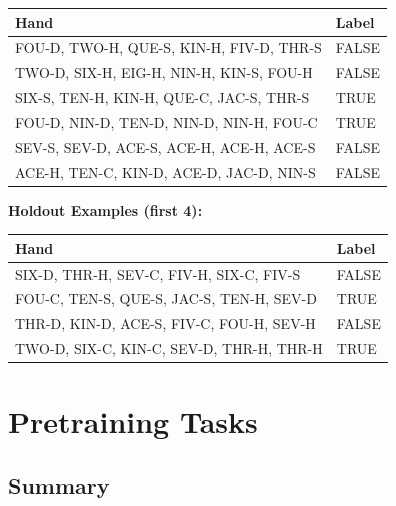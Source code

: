 \documentclass[10pt,a4paper]{article}
\begin{document}
\begin{small}
\begin{tabular}{p{8cm}l}
\toprule
Hand & Label \\
\midrule
FOU-D, TWO-H, QUE-S, KIN-H, FIV-D, THR-S & \textcolor{negative}{FALSE} \\
TWO-D, SIX-H, EIG-H, NIN-H, KIN-S, FOU-H & \textcolor{negative}{FALSE} \\
SIX-S, TEN-H, KIN-H, QUE-C, JAC-S, THR-S & \textcolor{positive}{TRUE} \\
FOU-D, NIN-D, TEN-D, NIN-D, NIN-H, FOU-C & \textcolor{positive}{TRUE} \\
SEV-S, SEV-D, ACE-S, ACE-H, ACE-H, ACE-S & \textcolor{negative}{FALSE} \\
ACE-H, TEN-C, KIN-D, ACE-D, JAC-D, NIN-S & \textcolor{negative}{FALSE} \\
\bottomrule
\end{tabular}
\end{small}

\textbf{Holdout Examples (first 4):}

\begin{small}
\begin{tabular}{p{8cm}l}
\toprule
Hand & Label \\
\midrule
SIX-D, THR-H, SEV-C, FIV-H, SIX-C, FIV-S & \textcolor{negative}{FALSE} \\
FOU-C, TEN-S, QUE-S, JAC-S, TEN-H, SEV-D & \textcolor{positive}{TRUE} \\
THR-D, KIN-D, ACE-S, FIV-C, FOU-H, SEV-H & \textcolor{negative}{FALSE} \\
TWO-D, SIX-C, KIN-C, SEV-D, THR-H, THR-H & \textcolor{positive}{TRUE} \\
\bottomrule
\end{tabular}
\end{small}

\vspace{0.5cm}


\section{Pretraining Tasks}

\subsection{Summary}
\end{document}
